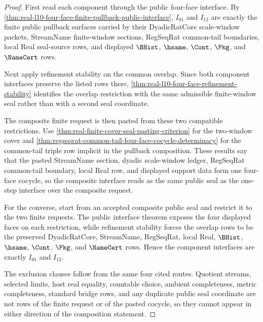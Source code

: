 \begin{proof}
First read each component through the public four-face interface. By \autoref{thm:real-l10-four-face-finite-pullback-public-interface}, $I_{01}$ and $I_{12}$ are exactly the finite public pullback surfaces carried by their DyadicRatCore scale-window packets, StreamName finite-window sections, RegSeqRat common-tail boundaries, local Real seal-source rows, and displayed $\BHist$, $\hsame$, $\Cont$, $\Pkg$, and $\NameCert$ rows.

Next apply refinement stability on the common overlap. Since both component interfaces preserve the listed rows there, \autoref{thm:real-l10-four-face-refinement-stability} identifies the overlap restriction with the same admissible finite-window seal rather than with a second seal coordinate.

The composite finite request is then pasted from these two compatible restrictions. Use \autoref{thm:real-finite-cover-seal-pasting-criterion} for the two-window cover and \autoref{thm:regseqrat-common-tail-four-face-cocycle-determinacy} for the common-tail triple row implicit in the pullback composition. These results say that the pasted StreamName section, dyadic scale-window ledger, RegSeqRat common-tail boundary, local Real row, and displayed support data form one four-face cocycle, so the composite interface reads as the same public seal as the one-step interface over the composite request.

For the converse, start from an accepted composite public seal and restrict it to the two finite requests. The public interface theorem exposes the four displayed faces on each restriction, while refinement stability forces the overlap rows to be the preserved DyadicRatCore, StreamName, RegSeqRat, local Real, $\BHist$, $\hsame$, $\Cont$, $\Pkg$, and $\NameCert$ rows. Hence the component interfaces are exactly $I_{01}$ and $I_{12}$.

The exclusion clauses follow from the same four cited routes. Quotient streams, selected limits, host real equality, countable choice, ambient completeness, metric completeness, standard bridge rows, and any duplicate public seal coordinate are not rows of the finite request or of the pasted cocycle, so they cannot appear in either direction of the composition statement.
\end{proof}

